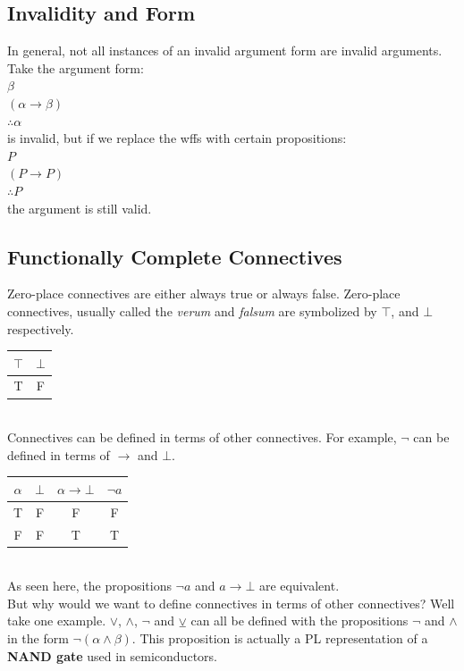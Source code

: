 \documentclass[]{article}
\begin{document}
\subsection{Invalidity and Form}
In general, not all instances of an invalid argument form are invalid arguments. Take the argument form:\vspace{5pt}\\
$\beta$\\
$(\alpha \rightarrow \beta)$\\
$\therefore \alpha$\vspace{5pt}\\
is invalid, but if we replace the wffs with certain propositions:\vspace{5pt}\\
$P$\\
$(P \rightarrow P)$\\
$\therefore P$\vspace{5pt}\\
the argument is still valid.
\subsection{Functionally Complete Connectives}
Zero-place connectives are either always true or always false.
Zero-place connectives, usually called the \textit{verum} and \textit{falsum} are symbolized by $\top$, and $\bot$ respectively.\vspace{5pt}\\
\begin{tabular}{|c|c|}
 \hline
 $\top$ & $\bot$\\
 \hline
 T & F\\
 \hline
\end{tabular}\vspace{5pt}\\
Connectives can be defined in terms of other connectives. For example, $\neg$ can be defined in terms of $\rightarrow$ and $\bot$.\vspace{5pt}\\
\begin{tabular}{|c|c|c|c|}
\hline
$\alpha$ & $\bot$  & $\alpha \rightarrow \bot$ & $\neg{a}$\\
\hline
T & F & F & F\\
\hline
F & F & T & T\\
\hline
\end{tabular}\vspace{5pt}\\
As seen here, the propositions $\neg{a}$ and $a \rightarrow \bot$ are equivalent.\vspace{5pt}\\
But why would we want to define connectives in terms of other connectives?
Well take one example. $\vee$, $\wedge$, $\neg$ and $\veebar$ can all be defined with the propositions $\neg$ and $\wedge$ in the form $\neg{(\alpha \wedge \beta)}$. This proposition is actually a PL representation of a \textbf{NAND gate} used in semiconductors.
\end{document}
